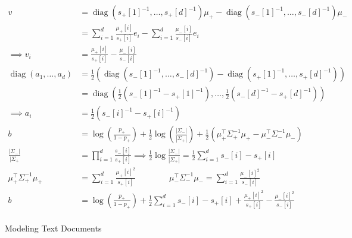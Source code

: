 \documentclass{amsart}
\DeclareMathOperator{\diag}{diag}
\theoremstyle{definition}
\begin{document}
\begin{enumerate}[(a)]
		\begin{align*}
			v &= \diag(s_+[1]^{-1}, \ldots, s_+[d]^{-1})\mu_+ - \diag(s_-[1]^{-1}, \ldots, s_-[d]^{-1})\mu_-\\
			&= \sum_{i=1}^{d}\frac{\mu_+[i]}{s_+[i]}e_i- \sum_{i=1}^{d}\frac{\mu_-[i]}{s_-[i]}e_i\\
			\implies v_i &= \frac{\mu_+[i]}{s_+[i]} - \frac{\mu_-[i]}{s_-[i]}\\
			\diag(a_1, \ldots, a_d) &= \frac{1}{2}(\diag(s_-[1]^{-1}, \ldots, s_-[d]^{-1}) - \diag(s_+[1]^{-1}, \ldots, s_+[d]^{-1}))\\
			&= \diag\left(\frac12\left(s_-[1]^{-1} - s_+[1]^{-1}\right), \ldots, \frac12\left(s_-[d]^{-1} - s_+[d]^{-1}\right)\right)\\
			\implies a_i &= \frac12\left(s_-[i]^{-1} - s_+[i]^{-1}\right)\\
			b &= \log\left(\frac{p_+}{1-p_+}\right) + \frac12 \log\left(\frac{|\Sigma_-|}{|\Sigma_+|}\right) + \frac{1}{2}(\mu_+^\intercal\Sigma_{+}^{-1}\mu_+ - \mu_-^\intercal\Sigma_{-}^{-1}\mu_-)\\
			\frac{|\Sigma_-|}{|\Sigma_+} &= \prod_{i=1}^{d}\frac{s_-[i]}{s_+[i]} \implies \frac{1}{2} \log \frac{|\Sigma_-|}{|\Sigma_+|} = \frac12\sum_{i=1}^{d} s_-[i] - s_+[i]\\
			\mu_+^\intercal\Sigma_{+}^{-1}\mu_+ &= \sum_{i=1}^{d}\frac{\mu_+[i]^2}{s_+[i]}\qquad\qquad \mu_-^\intercal\Sigma_{-}^{-1}\mu_- = \sum_{i=1}^{d}\frac{\mu_-[i]^2}{s_-[i]}\\
			b &= \log\left(\frac{p_+}{1-p_+}\right) + \frac12\sum_{i=1}^{d} s_-[i] - s_+[i]+ \frac{\mu_+[i]^2}{s_+[i]} - \frac{\mu_-[i]^2}{s_-[i]}\\
		\end{align*}
\end{enumerate}
\begin{center}
\LARGE Modeling Text Documents
\end{center}
\end{document}

